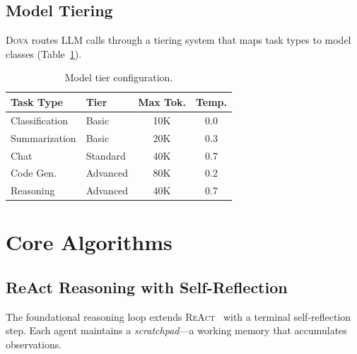 \documentclass{article}
\theoremstyle{plain}
\theoremstyle{definition}
\newcommand{\dova}{\textsc{Dova}}
\newcommand{\react}{\textsc{ReAct}}
\begin{document}
\subsection{Model Tiering}

\dova{} routes LLM calls through a tiering system that maps task types to
model classes (Table~\ref{tab:model_tiers}).

\begin{table}[t]
\caption{Model tier configuration.}
\label{tab:model_tiers}
\centering
\small
\begin{tabular}{@{}llcc@{}}
\toprule
\textbf{Task Type} & \textbf{Tier} & \textbf{Max Tok.} & \textbf{Temp.} \\
\midrule
Classification & Basic    & 10K  & 0.0 \\
Summarization  & Basic    & 20K  & 0.3 \\
Chat           & Standard & 40K  & 0.7 \\
Code Gen.      & Advanced & 80K  & 0.2 \\
Reasoning      & Advanced & 40K  & 0.7 \\
\bottomrule
\end{tabular}
\end{table}

\section{Core Algorithms}\label{sec:algorithms}

\subsection{ReAct Reasoning with Self-Reflection}\label{sec:react_algo}

The foundational reasoning loop extends \react{}~\citep{yao2023react} with a
terminal self-reflection step.  Each agent maintains a
\emph{scratchpad}---a working memory that accumulates observations.
\end{document}
